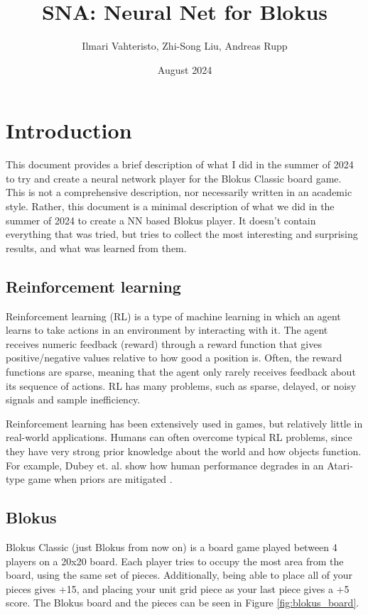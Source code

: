 \documentclass{article}
\title{SNA: Neural Net for Blokus}
\author{Ilmari Vahteristo, Zhi-Song Liu, Andreas Rupp}
\date{August 2024}
\begin{document}
\maketitle

\section{Introduction}
This document provides a brief description of what I did in the
summer of 2024 to try and create a neural network player for the
Blokus Classic board game. This is not a comprehensive description,
nor necessarily written in an academic style. Rather, this document
is a minimal description of what we did in the summer of 2024 to
create a NN based Blokus player. It doesn't contain everything
that was tried, but tries to collect the most interesting and
surprising results, and what was learned from them.

\subsection{Reinforcement learning}
Reinforcement learning (RL) is a type of machine learning in
which an agent learns to take actions in an environment by
interacting with it. The agent receives numeric feedback (reward)
through a reward function that gives positive/negative values
relative to how good a position is. Often, the reward functions
are sparse, meaning that the agent only rarely receives feedback
about its sequence of actions. RL has many problems, such as sparse,
delayed, or noisy signals and sample inefficiency.


Reinforcement learning has been extensively used in games, but
relatively little in real-world applications. Humans can often
overcome typical RL problems, since they have very strong prior
knowledge about the world and how objects function. For example,
Dubey et. al. show how human performance degrades in an Atari-type
game when priors are mitigated \cite{dubey2018investigating}.



\subsection{Blokus}
Blokus Classic (just Blokus from now on) is a board game played
between 4 players on a 20x20 board. Each player tries to occupy
the most area from the board, using the same set of pieces.
Additionally, being able to place all of your pieces gives +15,
and placing your unit grid piece as your last piece gives a +5
score. The Blokus board and the pieces can be seen in Figure
\ref{fig:blokus_board}.
\end{document}
